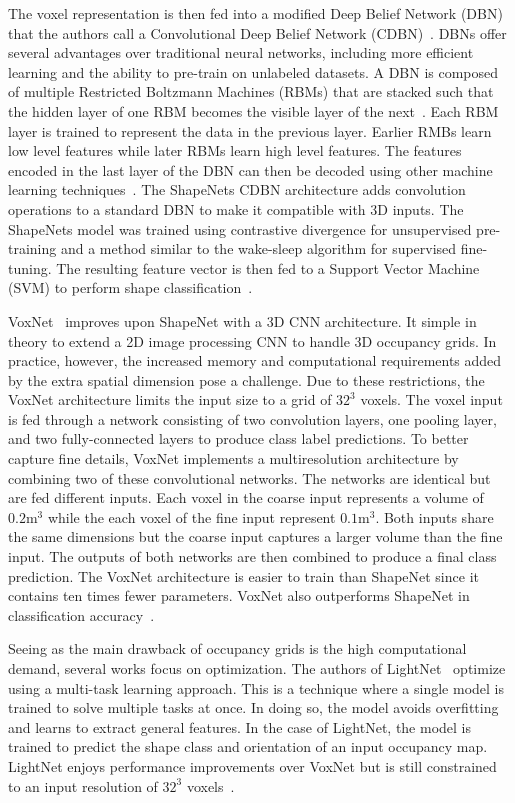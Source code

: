 The voxel representation is then fed into a modified Deep Belief Network (DBN) that the authors call a Convolutional Deep Belief Network (CDBN)~\cite{Wu2015}. DBNs offer several advantages over traditional neural networks, including more efficient learning and the ability to pre-train on unlabeled datasets. A DBN is composed of multiple Restricted Boltzmann Machines (RBMs) that are stacked such that the hidden layer of one RBM becomes the visible layer of the next~\cite{Aljabery2020}. Each RBM layer is trained to represent the data in the previous layer. Earlier RMBs learn low level features while later RBMs learn high level features. The features encoded in the last layer of the DBN can then be decoded using other machine learning techniques~\cite{McAfee2008}. The ShapeNets CDBN architecture adds convolution operations to a standard DBN to make it compatible with 3D inputs. The ShapeNets model was trained using contrastive divergence for unsupervised pre-training and a method similar to the wake-sleep algorithm for supervised fine-tuning. The resulting feature vector is then fed to a Support Vector Machine (SVM) to perform shape classification~\cite{Wu2015}.

VoxNet~\cite{Maturana2015} improves upon ShapeNet with a 3D CNN architecture. It simple in theory to extend a 2D image processing CNN to handle 3D occupancy grids. In practice, however, the increased memory and computational requirements added by the extra spatial dimension pose a challenge. Due to these restrictions, the VoxNet architecture limits the input size to a grid of $32^3$ voxels. The voxel input is fed through a network consisting of two convolution layers, one pooling layer, and two fully-connected layers to produce class label predictions. To better capture fine details, VoxNet implements a multiresolution architecture by combining two of these convolutional networks. The networks are identical but are fed different inputs. Each voxel in the coarse input represents a volume of $0.2\text{m}^3$ while the each voxel of the fine input represent $0.1\text{m}^3$. Both inputs share the same dimensions but the coarse input captures a larger volume than the fine input. The outputs of both networks are then combined to produce a final class prediction. The VoxNet architecture is easier to train than ShapeNet since it contains ten times fewer parameters. VoxNet also outperforms ShapeNet in classification accuracy~\cite{Maturana2015}.

Seeing as the main drawback of occupancy grids is the high computational demand, several works focus on optimization. The authors of LightNet~\cite{Ye2016} optimize using a multi-task learning approach. This is a technique where a single model is trained to solve multiple tasks at once. In doing so, the model avoids overfitting and learns to extract general features. In the case of LightNet, the model is trained to predict the shape class and orientation of an input occupancy map. LightNet enjoys performance improvements over VoxNet but is still constrained to an input resolution of $32^3$ voxels~\cite{Ye2016}. 

